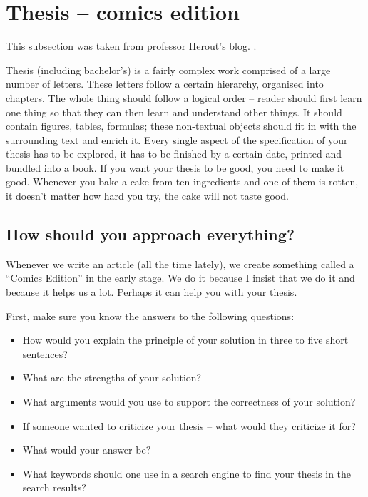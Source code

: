 \section{Thesis -- comics edition}

This subsection was taken from professor Herout's blog. \cite{Herout}.

Thesis (including bachelor's) is a fairly complex work comprised of a large number of letters. These letters follow a certain hierarchy, organised into chapters. The whole thing should follow a logical order -- reader should first learn one thing so that they can then learn and understand other things. It should contain figures, tables, formulas; these non-textual objects should fit in with the surrounding text and enrich it. Every single aspect of the specification of your thesis has to be explored, it has to be finished by a certain date, printed and bundled into a book. If you want your thesis to be good, you need to make it good. Whenever you bake a cake from ten ingredients and one of them is rotten, it doesn't matter how hard you try, the cake will not taste good.

\subsection*{How should you approach everything?}

Whenever we write an article (all the time lately), we create something called a ``Comics Edition'' in the early stage. We do it because I insist that we do it and because it helps us a lot. Perhaps it can help you with your thesis.

First, make sure you know the answers to the following questions:
\begin{itemize}
  \item{How would you explain the principle of your solution in three to five short sentences?}
  \item{What are the strengths of your solution?}
  \item{What arguments would you use to support the correctness of your solution?}
  \item{If someone wanted to criticize your thesis -- what would they criticize it for?}
  \item{What would your answer be?}
  \item{What keywords should one use in a search engine to find your thesis in the search results?}
\end{itemize}

